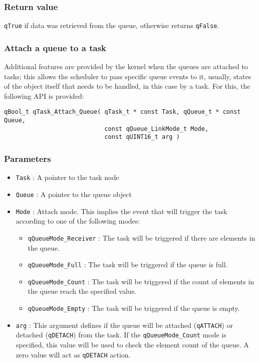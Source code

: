 \subsubsection*{Return value}
\lstinline{qTrue} if data was retrieved from the queue, otherwise returns \lstinline{qFalse}.

\subsubsection{Attach a queue to a task}
Additional features are provided by the kernel when the queues are attached to tasks; this allows the scheduler to pass specific queue events to it, usually, states of the object itself that needs to be handled, in this case by a task. For this, the following API is provided:  
\medskip
    
\begin{lstlisting}[style=CStyle]
qBool_t qTask_Attach_Queue( qTask_t * const Task, qQueue_t * const Queue,
                            const qQueue_LinkMode_t Mode, 
                            const qUINT16_t arg )
\end{lstlisting}
    
\subsubsection*{Parameters}
\begin{itemize}
    \item \lstinline{Task} : A pointer to the task node
    \item \lstinline{Queue} : A pointer to the queue object
    \item \lstinline{Mode} : Attach mode. This implies the event that will trigger the task according to one of the following modes:
    \begin{itemize}
        \item \lstinline{qQueueMode_Receiver} : The task will be triggered if there are elements in the queue. 
        \item \lstinline{qQueueMode_Full} :  The task will be triggered if the queue is full. 
        \item \lstinline{qQueueMode_Count} :  The task will be triggered if the count of elements in the queue reach the specified value. 
        \item \lstinline{qQueueMode_Empty} :  The task will be triggered if the queue is empty.
    \end{itemize}
    \item \lstinline{arg} : This argument defines if the queue will be attached (\lstinline{qATTACH}) or detached (\lstinline{qDETACH}) from the task. If the \lstinline{qQueueMode_Count} mode is specified, this value will be used to check the element count of the queue. A zero value will act as \lstinline{qDETACH} action. 
\end{itemize}  


